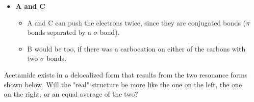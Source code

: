 \documentclass[12pt,a4paper]{article}
\begin{document}
\begin{enumerate}
{    \hspace{15pt}
    \hspace{15pt}
    \hspace{15pt}
    }
        \begin{itemize}
            \item {\color{o-Sun}\textbf{A and C}}
                \begin{itemize}
                    \item A and C can push the electrons twice, since they are conjugated bonds ($\pi$ bonds separated by a $\sigma$ bond).
                    \item B would be too, if there was a carbocation on either of the carbons with two $\sigma$ bonds.
                \end{itemize}
        \end{itemize}
    {\color{G-Moon}\item Acetamide exists in a delocalized form that results from the two resonance forms shown below.  Will the "real" structure be more like the one on the left, the one on the right, or an equal average of the two?

}
\end{enumerate}
\end{document}
